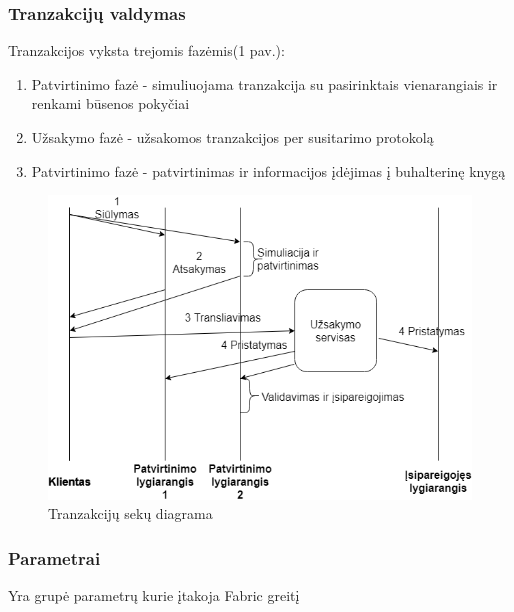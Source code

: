 \documentclass{VUMIFPSkursinis}
\begin{document}
		\subsubsection{Tranzakcijų valdymas}
			Tranzakcijos vyksta trejomis fazėmis(1 pav.):
			\begin{enumerate}
				\item{Patvirtinimo fazė - simuliuojama tranzakcija su pasirinktais vienarangiais ir renkami būsenos pokyčiai}
				\item{Užsakymo fazė - užsakomos tranzakcijos per susitarimo protokolą}
				\item{Patvirtinimo fazė - patvirtinimas ir informacijos įdėjimas į buhalterinę knygą }
			\end{enumerate}

			\begin{figure}[H]
			    \centering
			    \includegraphics[scale=0.5]{img/MLP}
			    \caption{Tranzakcijų sekų diagrama}   %
			    \label{img:mlp}
			\end{figure}
		\subsubsection{Parametrai}
			Yra grupė parametrų \cite{IMBResearch} kurie įtakoja Fabric greitį 
			
\end{document}
